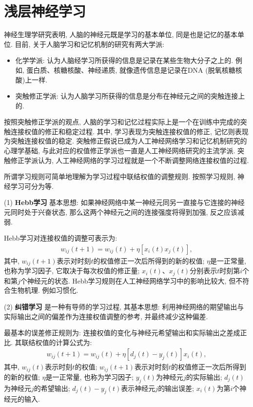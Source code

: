 \section{浅层神经学习}

神经生理学研究表明, 人脑的神经元既是学习的基本单位, 同是也是记忆的基本单位. 目前, 关于人脑学习和记忆机制的研究有两大学派:
\begin{itemize}
    \item 化学学派: 认为人脑经学习所获得的信息是记录在某些生物大分子之上的. 例如, 蛋白质、核糖核酸、神经递质, 就像遗传信息是记录在DNA (脱氧核糖核酸)上一样.
    \item 突触修正学派: 认为人脑学习所获得的信息是分布在神经元之间的突触连接上的.
\end{itemize}

按照突触修正学派的观点, 人脑的学习和记忆过程实际上是一个在训练中完成的突触连接权值的修正和稳定过程. 其中, 学习表现为突触连接权值的修正, 记忆则表现为突触连接权值的稳定.
突触修正假说已成为人工神经网络学习和记忆机制研究的心理学基础, 与此对应的权值修正学派也一直是人工神经网络研究的主流学派.
突触修正学派认为, 人工神经网络的学习过程就是一个不断调整网络连接权值的过程.

所谓学习规则可简单地理解为学习过程中联结权值的调整规则. 按照学习规则, 神经学习可分为等.

 (1) \textbf{Hebb学习} 基本思想: 如果神经网络中某一神经元同另一直接与它连接的神经元同时处于兴奋状态, 那么这两个神经元之间的连接强度将得到加强, 反之应该减弱.

Hebb学习对连接权值的调整可表示为:
\begin{align}
    w_{i j} (t+1)=w_{i j} (t)+\eta\left[x_{i} (t) x_{j} (t)\right],
\end{align}
其中, $w_{ij} (t+1)$表示对时刻$t$的权值修正一次后所得到的新的权值; $\eta$是一正常量, 也称为学习因子, 它取决于每次权值的修正量;
$x_i (t)$、$x_j (t)$分别表示$t$时刻第$i$个和第$j$个神经元的状态.
Hebb学习规则在人工神经网络学习中的影响比较大, 但不符合生物机理. 例如习惯化.

 (2) \textbf{纠错学习} 是一种有导师的学习过程, 其基本思想: 利用神经网络的期望输出与实际输出之间的偏差作为连接权值调整的参考, 并最终减少这种偏差.

最基本的误差修正规则为: 连接权值的变化与神经元希望输出和实际输出之差成正比. 其联结权值的计算公式为:
\begin{align}
    w_{i j} (t+1)=w_{i j} (t)+\eta\left[d_{j} (t)-y_{j} (t)\right] x_{i} (t),
\end{align}
其中, $w_{ij} (t)$表示时刻$t$的权值; $w_{ij} (t+1)$表示对时刻$t$的权值修正一次后所得到的新的权值; $\eta$是一正常量, 也称为学习因子; $y_j (t)$为神经元$j$的实际输出; $d_j (t)$为神经元$j$的希望输出; $d_j (t)-y_j (t)$表示神经元$j$的输出误差; $x_i (t)$为第$i$个神经元的输入.

